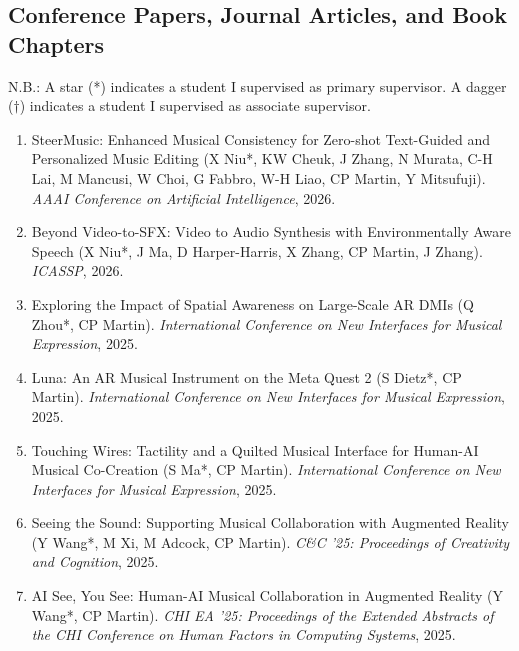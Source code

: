 \documentclass[11pt, a4paper, oneside]{article}
\begin{document}
\subsection{Conference Papers, Journal Articles, and Book Chapters}

N.B.: A star (*) indicates a student I supervised as primary supervisor. A dagger ($\dagger$) indicates a student I supervised as associate supervisor.

\begin{enumerate}

\item SteerMusic: Enhanced Musical Consistency for Zero-shot Text-Guided and Personalized Music Editing (X Niu*, KW Cheuk, J Zhang, N Murata, C-H Lai, M Mancusi, W Choi, G Fabbro, W-H Liao, CP Martin, Y Mitsufuji). \emph{AAAI Conference on Artificial Intelligence}, 2026. 

\item Beyond Video-to-SFX: Video to Audio Synthesis with Environmentally Aware Speech (X Niu*, J Ma, D Harper-Harris, X Zhang, CP Martin, J Zhang). \emph{ICASSP}, 2026. 

\item Exploring the Impact of Spatial Awareness on Large-Scale AR DMIs (Q Zhou*, CP Martin). \emph{International Conference on New Interfaces for Musical Expression}, 2025.

\item Luna: An AR Musical Instrument on the Meta Quest 2 (S Dietz*, CP Martin). \emph{International Conference on New Interfaces for Musical Expression}, 2025.

\item Touching Wires: Tactility and a Quilted Musical Interface for Human-AI Musical Co-Creation (S Ma*, CP Martin). \emph{International Conference on New Interfaces for Musical Expression}, 2025.

\item Seeing the Sound: Supporting Musical Collaboration with Augmented Reality (Y Wang*, M Xi, M Adcock, CP Martin). \emph{C\&C '25: Proceedings of Creativity and Cognition}, 2025. 

\item AI See, You See: Human-AI Musical Collaboration in Augmented Reality (Y Wang*, CP Martin). \emph{CHI EA '25: Proceedings of the Extended Abstracts of the CHI Conference on Human Factors in Computing Systems}, 2025. 


\end{enumerate}
\end{document}
